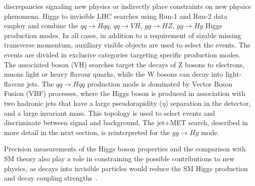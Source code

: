 discrepancies signaling new physics or indirectly place constraints on new physics phenomena. 
Higgs to invisible LHC searches using Run-1 and Run-2 data~\cite{Khachatryan:2016whc,Aad:2015pla} employ and combine the $qq \rightarrow H qq$, $qq \rightarrow VH$, $gg \rightarrow HZ$, $gg \rightarrow Hg$ Higgs production modes. 
In all cases, in addition to a requirement of sizable missing transverse momentum, auxiliary visible objects are used to select the events. 
The events are divided in exclusive categories targeting specific production modes. The associated boson (VH) searches target the decays of Z bosons to electrons, muons light or heavy flavour quarks, while the W bosons can decay into light-flavour jets. 
The $qq \rightarrow H qq$ production mode is dominated by Vector Boson Fusion (VBF) processes, where the Higgs boson is produced in association with two hadronic jets that have a large pseudorapidity ($\eta$)
separation in the detector, and a large invariant mass. This topology is used to select events and discriminate between signal and background. 
The jet+MET search, described in more detail in the next section, is reinterpreted for the $gg \rightarrow Hg$ mode. 

Precision measurements of the Higgs boson properties and the comparison with SM theory also play a role in constraining the possible contributions to new physics, as decays into invisible particles would reduce the SM Higgs production and decay coupling strengths~\cite{Khachatryan:2016vau,Englert:2011yb,Aad:2015pla}. 

